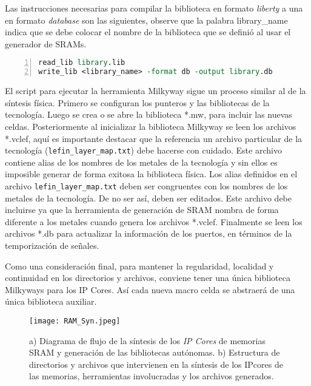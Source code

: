 Las instrucciones necesarias para compilar la biblioteca en formato \textit{liberty} a una en formato \textit{database} son las siguientes, observe que la palabra library\_name indica que se debe colocar el nombre de la biblioteca que se definió al usar el generador de SRAMs.

\begin{lstlisting}[language= tcl, numbers=left, keywordstyle=\color{blue}, commentstyle=\color{mygreen}]
read_lib library.lib
write_lib <library_name> -format db -output library.db
\end{lstlisting}


El script para ejecutar la herramienta Milkyway sigue un proceso similar al de la síntesis física. Primero se configuran los punteros y las bibliotecas de la tecnología. Luego se crea o se abre la biblioteca *.mw, para incluir las nuevas celdas. Posteriormente al inicializar la biblioteca Milkyway se leen los archivos *.vclef, aquí es importante destacar que la referencia un archivo particular de la tecnología (\texttt{lefin\_layer\_map.txt}) debe hacerse con cuidado. Este archivo contiene alias de los nombres de los metales de la tecnología y sin ellos es imposible generar de forma exitosa la biblioteca física. Los alias definidos en el archivo \texttt{lefin\_layer\_map.txt} deben ser congruentes con los nombres de los metales de la tecnología. De no ser así, deben ser editados. Este archivo debe incluirse ya que la herramienta de generación de SRAM nombra de forma diferente a los metales cuando genera los archivos *.vclef. Finalmente se leen los archivos *.db para actualizar la información de los puertos, en términos de la temporización de señales.

Como una consideración final, para mantener la regularidad, localidad y continuidad en los directorios y archivos, conviene tener una única biblioteca Milkyways para los IP Cores. Así cada nueva macro celda se abstraerá de una única biblioteca auxiliar.

\begin{figure}[ht]
\texttt{[image: RAM\_Syn.jpeg]}
\centering
\caption{a) Diagrama de flujo de la síntesis de los \textit{IP Cores} de memorias SRAM y generación de las bibliotecas autónomas. \newline b) Estructura de directorios y archivos que intervienen en la síntesis de los IPcores de las memorias, herramientas involucradas y los archivos generados.}
\end{figure}

\newpage

